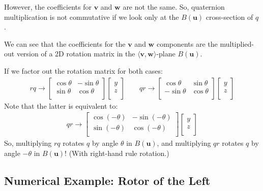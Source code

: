 \documentclass[12pt]{article}
\begin{document}
	However, the coefficients for $\mathbf{v}$ and $\mathbf{w}$ are not the same. So, quaternion multiplication is not commutative if we look only at the $B(\mathbf{u})$ cross-section of $q$.
	
	We can see that the coefficients for the $\mathbf{v}$ and $\mathbf{w}$ components are the multiplied-out version of a 2D rotation matrix in the $\langle \mathbf{v}, \mathbf{w} \rangle$-plane $B(\mathbf{u})$.
		
		If we factor out the rotation matrix for both cases:
		\begin{align*}
			rq \rightarrow \begin{bmatrix}
							\cos\theta & -\sin\theta \\
							\sin\theta & \cos\theta \\
						\end{bmatrix}
						\begin{bmatrix}
							y \\
							z \\
						\end{bmatrix} \qquad
			qr \rightarrow \begin{bmatrix}
							\cos\theta & \sin\theta \\
							-\sin\theta & \cos\theta \\
						\end{bmatrix}
						\begin{bmatrix}
							y \\
							z \\
						\end{bmatrix}
		\end{align*}
		Note that the latter is equivalent to:
		\begin{align*}
			qr \rightarrow \begin{bmatrix}
							\cos(-\theta) & -\sin(-\theta) \\
							\sin(-\theta) & \cos(-\theta) \\
						\end{bmatrix}
						\begin{bmatrix}
							y \\
							z \\
						\end{bmatrix}
		\end{align*}		
		So, multiplying $rq$ rotates $q$ by angle $\theta$ in $B(\mathbf{u})$, and multiplying $qr$ rotates $q$ by angle $-\theta$ in $B(\mathbf{u})$! 
		(With right-hand rule rotation.)
	 	
	 	\subsection{Numerical Example: Rotor of the Left}
	 					
\end{document}
